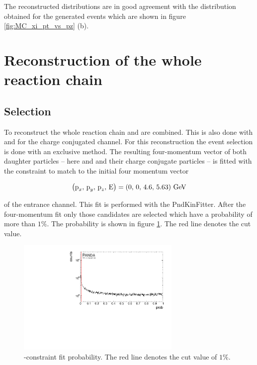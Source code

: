 	The reconstructed distributions are in good agreement with the distribution obtained for the generated events which are 
	shown in figure \ref{fig:MC_xi_pt_vs_pz} (b).
	
	
	
\newpage
\section{Reconstruction of the whole reaction chain}

	\subsection*{Selection}
	
	To reconstruct the whole reaction chain \excitedcascade and \anticascade are combined.
	This is also done with \excitedanticascade and \cascade for the charge conjugated channel.
	For this reconstruction the event selection is done with an exclusive method.
	The resulting four-momentum vector of both daughter particles --  here \excitedcascade 
	and \anticascade and their charge conjugate particles -- is fitted with the constraint to match to the initial four momentum vector  

	\begin{center}
		\begin{equation}\nonumber
			\left(\textnormal{p}_x,\, \textnormal{p}_y,\, \textnormal{p}_z,\, \textnormal{E} \right) = \left(0,\, 0,\, 4.6,\, 5.63 \right) \, \textnormal{GeV}
		\end{equation}
	\end{center}
	of the \pbarpSystem entrance channel.	
	This fit is performed with the PndKinFitter.
	After the four-momentum fit only those candidates are selected which have a probability of more than $1\%$.
	The probability is shown in figure \ref{fig:xisys_prob}. 
	The red line denotes the cut value.

	\begin{figure}
		\centering
		\includegraphics[width=0.7\textwidth]{./plots/pbarp/XiSys_prob.pdf}
		\caption{-constraint fit probability. The red line denotes the cut value of $1\%$.}
		\label{fig:xisys_prob}
	\end{figure}
	

